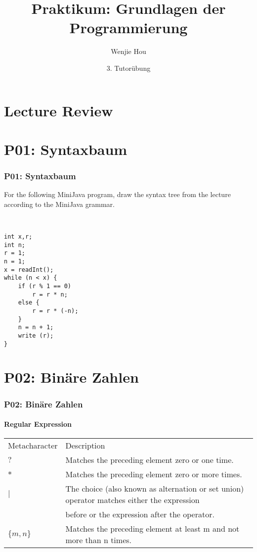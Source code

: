 \documentclass[handout, navsym]{tum-presentation}
\title{Praktikum: Grundlagen der Programmierung}
\author[Wenjie Hou]{Wenjie Hou}
\date{3. Tutorübung}
\institute{\theuniversity\par Fakultät für Informatik}
\numberwithin{equation}{section}
\begin{document}
\begin{frame}[noframenumbering]
  \titlepage
\end{frame}

\section{Lecture Review}

\section{P01: Syntaxbaum}
\begin{frame}[fragile]
  \frametitle{P01: Syntaxbaum}
  \vspace*{\fill}
\large  For the following MiniJava program, draw the syntax tree from the lecture according to the MiniJava grammar. \par
~\\
\bigskip
\center
\begin{lstlisting}
int x,r;
int n;
r = 1;
n = 1;
x = readInt();
while (n < x) {
    if (r % 1 == 0)
        r = r * n;
    else {
        r = r * (-n);
    }
    n = n + 1;
    write (r);
}
\end{lstlisting}

\vspace*{\fill}
\end{frame}

\section{P02: Binäre Zahlen}

\begin{frame}[fragile]
\frametitle{P02: Binäre Zahlen}
\framesubtitle{Regular Expression}
\vspace*{\fill} \large
\begin{tabular}{l|l}
Metacharacter&Description\\
$?$&Matches the preceding element zero or one time.\\
$*$&Matches the preceding element zero or more times.\\
$|$&The choice (also known as alternation or set union) operator matches either the expression\\ &before or the expression after the operator.\\
$\{m,n\}$&Matches the preceding element at least m and not more than n times.\\
\end{tabular}
\vspace*{\fill}

\end{frame}
\end{document}
